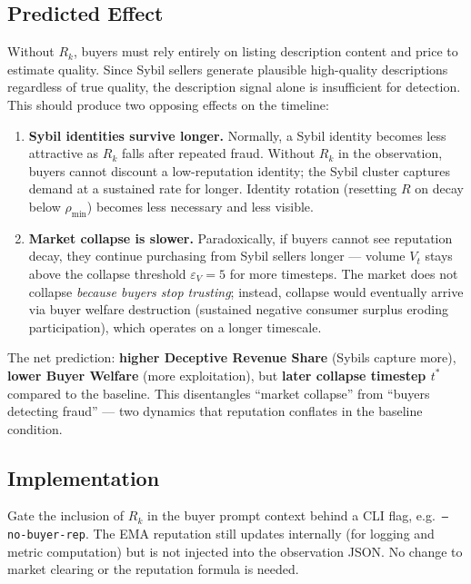 \documentclass{article}
\begin{document}
\subsection{Predicted Effect}

Without $R_k$, buyers must rely entirely on listing description content and price to estimate quality. Since Sybil sellers generate plausible high-quality descriptions regardless of true quality, the description signal alone is insufficient for detection. This should produce two opposing effects on the timeline:

\begin{enumerate}
  \item \textbf{Sybil identities survive longer.} Normally, a Sybil identity becomes less attractive as $R_k$ falls after repeated fraud. Without $R_k$ in the observation, buyers cannot discount a low-reputation identity; the Sybil cluster captures demand at a sustained rate for longer. Identity rotation (resetting $R$ on decay below $\rho_{\min}$) becomes less necessary and less visible.
  \item \textbf{Market collapse is slower.} Paradoxically, if buyers cannot see reputation decay, they continue purchasing from Sybil sellers longer --- volume $V_t$ stays above the collapse threshold $\varepsilon_V = 5$ for more timesteps. The market does not collapse \emph{because buyers stop trusting}; instead, collapse would eventually arrive via buyer welfare destruction (sustained negative consumer surplus eroding participation), which operates on a longer timescale.
\end{enumerate}

The net prediction: \textbf{higher Deceptive Revenue Share} (Sybils capture more), \textbf{lower Buyer Welfare} (more exploitation), but \textbf{later collapse timestep $t^*$} compared to the baseline. This disentangles ``market collapse'' from ``buyers detecting fraud'' --- two dynamics that reputation conflates in the baseline condition.

\subsection{Implementation}

Gate the inclusion of $R_k$ in the buyer prompt context behind a CLI flag, e.g.\ \texttt{--no-buyer-rep}. The EMA reputation still updates internally (for logging and metric computation) but is not injected into the observation JSON. No change to market clearing or the reputation formula is needed.
\end{document}
